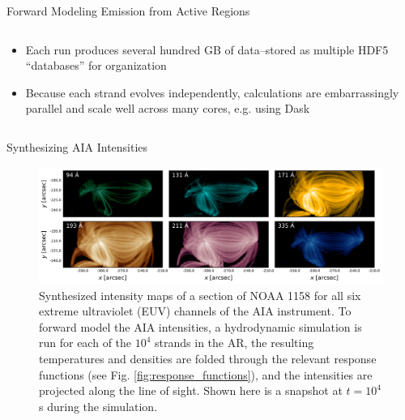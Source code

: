 \documentclass[final]{beamer}
\begin{document}
\begin{frame}
\begin{columns}[T]
\begin{column}{0.49\linewidth}
\begin{block}{Forward Modeling Emission from Active Regions}
\begin{columns}[c]
\begin{column}{0.49\columnwidth}
\begin{itemize}
\begin{enumerate}
                    \item Map temperature and density from each strand into the extrapolated field such that we have temperature and density in time and 3D cartesian space, $T(x,y,z,t)$ and $n(x,y,z,t)$
                    \item At each timestep, calculate the intensity in each EUV channel, $c$, using the AIA response functions (see Fig. \ref{fig:response_functions}) and taking the LOS to be along the $z$-axis,
                    \begin{equation}
                        I_c(x,y,t) = \int\mathrm{d}z\,n^2(x,y,z,t)K_c(T(x,y,z,t)),
                    \end{equation}
                    where $K_c$ is the temperture response function of channel $c$.
                    \item Apply a gaussian filter to each synthesized image to simulate the point spread function of the instrument
                \end{enumerate}
                \item Each run produces several hundred GB of data--stored as multiple HDF5 ``databases'' for organization
                \item Because each strand evolves independently, calculations are embarrassingly parallel and scale well across many cores, e.g. using Dask \citep{dask_development_team_dask:_2016}
            \end{itemize}
        \end{column}
    \end{columns}
    \end{block}
    \begin{block}{Synthesizing AIA Intensities}
        \begin{figure}
            \includegraphics[width=\columnwidth]{figures/aia_intensities.pdf}
            \caption{Synthesized intensity maps of a section of NOAA 1158 for all six extreme ultraviolet (EUV) channels of the AIA instrument. To forward model the AIA intensities, a hydrodynamic simulation is run for each of the $10^4$ strands in the AR, the resulting temperatures and densities are folded through the relevant response functions (see Fig. \ref{fig:response_functions}), and the intensities are projected along the line of sight. Shown here is a snapshot at $t=10^4$ s during the simulation.} 

\end{figure}
\end{block}
\end{column}
\end{columns}
\end{frame}
\end{document}
